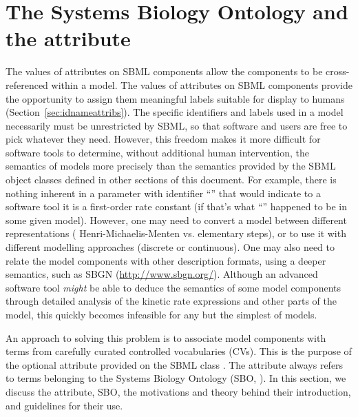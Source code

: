 
\section{The Systems Biology Ontology and the  attribute}
\label{sec:sboTerm}
\label{sec:sbo}

The values of  attributes on SBML components
allow the components to be cross-referenced within a model. The
values of  attributes on SBML components
provide the opportunity to assign them meaningful labels
suitable for display to humans
(Section~\ref{sec:idnameattribs}).  The specific identifiers and
labels used in a model necessarily must be unrestricted by SBML,
so that software and users are free to pick whatever they need.
However, this freedom makes it more difficult for software tools
to determine, without additional human intervention, the semantics
of models more precisely than the semantics provided by the SBML
object classes defined in other sections of this document.  For
example, there is nothing inherent in a parameter with identifier
``'' that would indicate to a software tool it is a
first-order rate constant (if that's what ``'' happened
to be in some given model).  However, one may need to convert a
model between different representations (\eg
Henri-Michaelis-Menten vs. elementary steps), or to use it with
different modelling approaches (discrete or continuous).  One may
also need to relate the model components with other description
formats, using a deeper semantics, such as SBGN (\url{http://www.sbgn.org/}).  Although an advanced software
tool \emph{might} be able to deduce the semantics of some model
components through detailed analysis of the kinetic rate expressions
and other parts of the model, this quickly becomes infeasible for
any but the simplest of models.

An approach to solving this problem is to associate model
components with terms from carefully curated controlled
vocabularies (CVs).  This is the purpose of the optional
 attribute provided on the SBML
class \SBase.  The  attribute always refers to
terms belonging to the Systems Biology Ontology (SBO, \citep{courtot:2011}). In
this section, we discuss the  attribute,
SBO, the motivations and theory behind their introduction, and
guidelines for their use.

